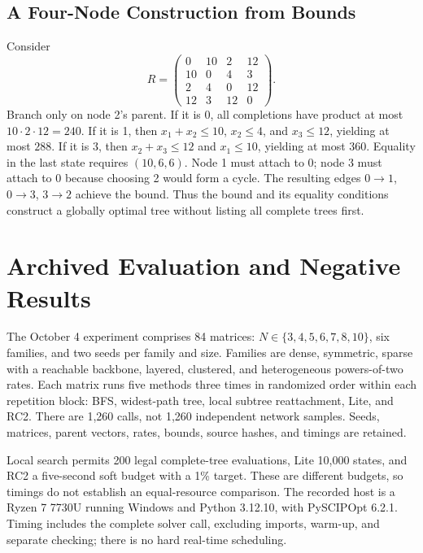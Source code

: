 \documentclass[conference,letterpaper]{IEEEtran}
\begin{document}
\subsection{A Four-Node Construction from Bounds}
Consider
\begin{equation}
R=\begin{pmatrix}0&10&2&12\\10&0&4&3\\2&4&0&12\\12&3&12&0\end{pmatrix}.
\end{equation}
Branch only on node 2's parent. If it is 0, all completions have product at most $10\cdot2\cdot12=240$. If it is 1, then $x_1+x_2\le10$, $x_2\le4$, and $x_3\le12$, yielding at most $288$. If it is 3, then $x_2+x_3\le12$ and $x_1\le10$, yielding at most $360$. Equality in the last state requires $(10,6,6)$. Node 1 must attach to 0; node 3 must attach to 0 because choosing 2 would form a cycle. The resulting edges $0\to1$, $0\to3$, $3\to2$ achieve the bound. Thus the bound and its equality conditions construct a globally optimal tree without listing all complete trees first.

\section{Archived Evaluation and Negative Results}
The October 4 experiment comprises 84 matrices: $N\in\{3,4,5,6,7,8,10\}$, six families, and two seeds per family and size. Families are dense, symmetric, sparse with a reachable backbone, layered, clustered, and heterogeneous powers-of-two rates. Each matrix runs five methods three times in randomized order within each repetition block: BFS, widest-path tree, local subtree reattachment, Lite, and RC2. There are 1,260 calls, not 1,260 independent network samples. Seeds, matrices, parent vectors, rates, bounds, source hashes, and timings are retained.

Local search permits 200 legal complete-tree evaluations, Lite 10,000 states, and RC2 a five-second soft budget with a 1\% target. These are different budgets, so timings do not establish an equal-resource comparison. The recorded host is a Ryzen 7 7730U running Windows and Python 3.12.10, with PySCIPOpt 6.2.1. Timing includes the complete solver call, excluding imports, warm-up, and separate checking; there is no hard real-time scheduling.
\end{document}
